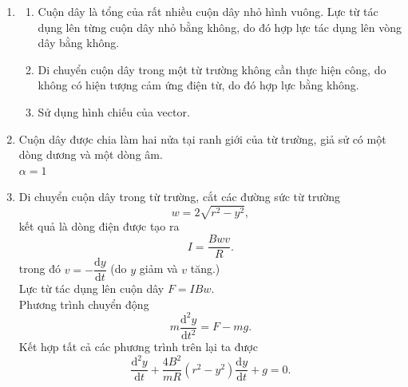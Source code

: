 \begin{loigiai}
\begin{enumerate}[1)]
    \item 
\begin{enumerate}
    \item Cuộn dây là tổng của rất nhiều cuộn dây nhỏ hình vuông. Lực từ tác dụng lên từng cuộn dây nhỏ bằng không, do đó hợp lực tác dụng lên vòng dây bằng không. 
    \item Di chuyển cuộn dây trong một từ trường không cần thực hiện công, do không có hiện tượng cảm ứng điện từ, do đó hợp lực bằng không.
    \item Sử dụng hình chiếu của vector.
\end{enumerate}
    \item Cuộn dây được chia làm hai nửa tại ranh giới của từ trường, giả sử có một dòng dương và một dòng âm.\\$\alpha=1$
    \item Di chuyển cuộn dây trong từ trường, cắt các đường sức từ trường
    \[w=2\sqrt{r^2-y^2},\]
    kết quả là dòng điện được tạo ra
    \[I=\dfrac{Bwv}{R}.\]
    trong đó $v=-\dfrac{\mathrm{d}y}{\mathrm{d}t}$ (do $y$ giảm và $v$ tăng.)\\
    Lực từ tác dụng lên cuộn dây $F=IBw$.\\
    Phương trình chuyển động
    \[m\dfrac{\mathrm{d}^2y}{\mathrm{d}t^2}=F-mg.\]
    Kết hợp tất cả các phương trình trên lại ta được
    \[\dfrac{\mathrm{d}^2y}{\mathrm{d}t}+\dfrac{4B^2}{mR}(r^2-y^2)\dfrac{\mathrm{d}y}{\mathrm{d}t}+g=0.\]
\end{enumerate}
\end{loigiai}



